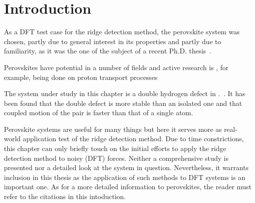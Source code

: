 \section{Introduction}
\label{sec:perovskites-introduction}

As a DFT test case for the ridge detection method, the  perovskite system was chosen, partly due to general interest in its properties and partly due to familiarity, as it was the one of the subject of a recent Ph.D. thesis~\cite{nicolai-2010}.

Perovskites have potential in a number of fields and active research is , for example, being done on proton transport processes~\cite{perovskites-hydrogen-diffusion-2007, perovskites-proton-transport-2008}

The system under study in this chapter is a double hydrogen defect in .~\cite{double-defect-2011}.
It has been found that the double defect is more stable than an isolated one and that coupled motion of the pair is faster than that of a single atom.

Perovskite systems are useful for many things but here it serves more as real-world application test of the ridge detection method.
Due to time constrictions, this chapter can only briefly touch on the initial efforts to apply the ridge detection method to noisy (DFT) forces.
Neither a comprehensive study is presented nor a detailed look at the system in question.
Nevertheless, it warrants inclusion in this thesis as the application of such methods to DFT systems is an important one.
As for a more detailed information to perovskites, the reader must refer to the citations in this intoduction.






